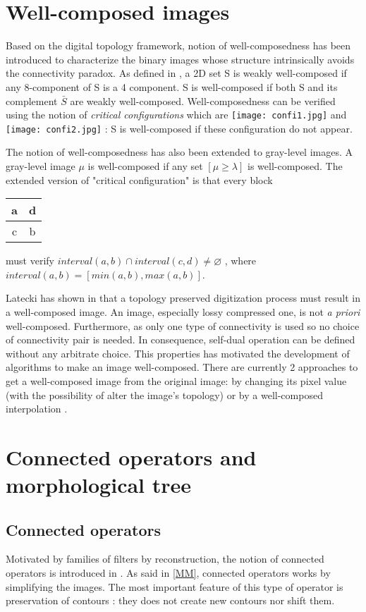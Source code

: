 \section{Well-composed images} \label{Wellcomposed}
Based on the digital topology framework, notion of well-composedness has been introduced to characterize the binary images whose structure intrinsically avoids the connectivity paradox. As defined in \cite{Latecki95}, a 2D set S is weakly well-composed if any 8-component of S is a 4 component. S is well-composed if both S and its complement $\bar{S}$ are weakly well-composed. Well-composedness can be verified  using the notion of \textit{critical configurations} which are \texttt{[image: confi1.jpg]} and \texttt{[image: confi2.jpg]} : S is well-composed if these configuration do not appear. 
\par
The notion of well-composedness has also been extended to gray-level images. A gray-level image $\mu$ is well-composed if any set $[\mu \geq \lambda ]$ is well-composed. The extended version of "critical configuration" is that every block
\begin{tabular}{|c|c|}
\hline 
a & d \\ 
\hline 
c & b \\ 
\hline 
\end{tabular} 
must verify $interval(a,b) \cap interval(c,d) \neq \varnothing$ , where $interval(a,b) = [min(a,b),max(a,b)]$.
\par
Latecki has shown in \cite{Latecki.98.JMIV} that a topology preserved digitization process must result in a well-composed image. An image, especially lossy compressed one, is not \textit{a priori} well-composed. Furthermore, as only one type of connectivity is used so no choice of connectivity pair is needed. In consequence, self-dual operation can be defined without any arbitrate choice. This properties has motivated the development of algorithms to make an image well-composed. There are currently 2 approaches to get a well-composed image from the original image: by changing its pixel value (with the possibility of alter the image's topology) or by a well-composed interpolation \cite{theo.2014}.


\section{Connected operators and morphological tree}
\subsection{Connected operators}
Motivated by families of filters by reconstruction, the notion of connected operators is introduced in \cite{Salembier95flatzones} \cite{Serra1993}. As said in \ref{MM}, connected operators works by simplifying the images. The most important feature of this type of operator is preservation of contours \cite{Salembier2009}: they does not create new contours nor shift them. 
